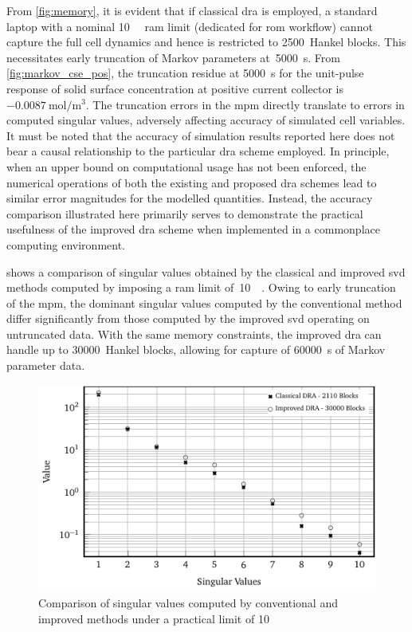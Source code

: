From  \cref{fig:memory},   it  is  evident   that  if  classical   \gls{dra}  is
employed,  a  standard  laptop  with  a  nominal  \SI{10}{\giga\byte}  \gls{ram}
limit   (dedicated   for   \gls{rom}   workflow)   cannot   capture   the   full
cell   dynamics  and   hence   is  restricted   to   2500~Hankel  blocks.   This
necessitates early  truncation of Markov parameters  at~\SI{5000}{\second}. From
\cref{fig:markov_cse_pos}, the truncation residue  at \SI{5000}{\second} for the
unit-pulse response of solid surface concentration at positive current collector
is~$\SI{-0.0087}{\mole\per\meter\cubed}$. The truncation errors in the \gls{mpm}
directly translate  to errors in  computed singular values,  adversely affecting
accuracy of  simulated cell  variables. It  must be noted  that the  accuracy of
simulation results  reported here  does not  bear a  causal relationship  to the
particular  \gls{dra} scheme  employed. In  principle,  when an  upper bound  on
computational usage has not been enforced,  the numerical operations of both the
existing and proposed \gls{dra} schemes lead to similar error magnitudes for the
modelled quantities. Instead, the accuracy comparison illustrated here primarily
serves to demonstrate the practical  usefulness of the improved \gls{dra} scheme
when implemented in a commonplace computing environment.

  shows a  comparison  of singular  values  obtained by  the
classical and improved \gls{svd} methods  computed by imposing a \gls{ram} limit
of~\SI{10}{\giga\byte}. Owing to early truncation of the \gls{mpm}, the dominant
singular values  computed by the  conventional method differ  significantly from
those computed by the improved \gls{svd} operating on untruncated data. With the
same memory  constraints, the improved  \gls{dra} can handle up  to 30000~Hankel
blocks, allowing for capture of \SI{60000}{\second} of Markov parameter data.

\begin{figure}[!htbp]
    \centering
    \includegraphics{truncated.pdf}
    \caption{Comparison of singular values computed by conventional and improved
         methods under a practical  limit of
    \SI{10}{\giga\byte}}
    \label{fig:truncated}
\end{figure}

